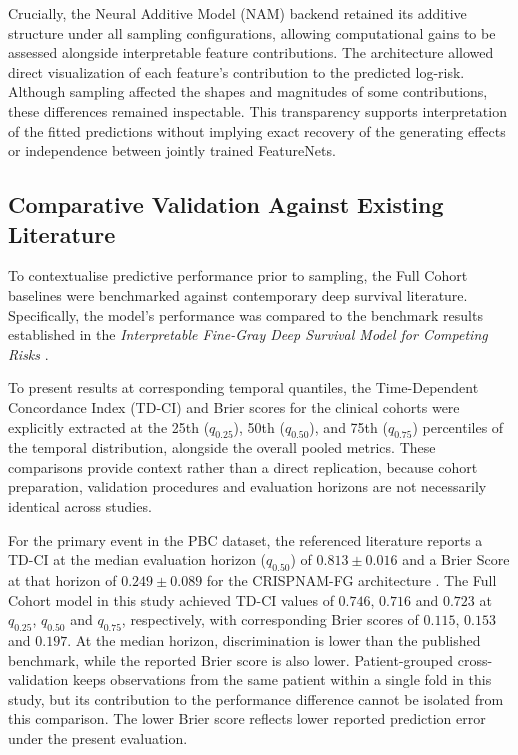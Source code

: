 \documentclass[a4paper,twoside,12pt]{report}
\begin{document}
Crucially, the Neural Additive Model (NAM) backend retained its additive structure under all sampling configurations, allowing computational gains to be assessed alongside interpretable feature contributions. The architecture allowed direct visualization of each feature's contribution to the predicted log-risk. Although sampling affected the shapes and magnitudes of some contributions, these differences remained inspectable. This transparency supports interpretation of the fitted predictions without implying exact recovery of the generating effects or independence between jointly trained FeatureNets.

\subsection{Comparative Validation Against Existing Literature}

To contextualise predictive performance prior to sampling, the Full Cohort baselines were benchmarked against contemporary deep survival literature. Specifically, the model's performance was compared to the benchmark results established in the \textit{Interpretable Fine-Gray Deep Survival Model for Competing Risks} \citep{InterpretableFineGray2025}.

To present results at corresponding temporal quantiles, the Time-Dependent Concordance Index (TD-CI) and Brier scores for the clinical cohorts were explicitly extracted at the 25th ($q_{0.25}$), 50th ($q_{0.50}$), and 75th ($q_{0.75}$) percentiles of the temporal distribution, alongside the overall pooled metrics. These comparisons provide context rather than a direct replication, because cohort preparation, validation procedures and evaluation horizons are not necessarily identical across studies.

For the primary event in the PBC dataset, the referenced literature reports a TD-CI at the median evaluation horizon ($q_{0.50}$) of $0.813 \pm 0.016$ and a Brier Score at that horizon of $0.249 \pm 0.089$ for the CRISPNAM-FG architecture \citep{InterpretableFineGray2025}. The Full Cohort model in this study achieved TD-CI values of $0.746$, $0.716$ and $0.723$ at $q_{0.25}$, $q_{0.50}$ and $q_{0.75}$, respectively, with corresponding Brier scores of $0.115$, $0.153$ and $0.197$. At the median horizon, discrimination is lower than the published benchmark, while the reported Brier score is also lower. Patient-grouped cross-validation keeps observations from the same patient within a single fold in this study, but its contribution to the performance difference cannot be isolated from this comparison. The lower Brier score reflects lower reported prediction error under the present evaluation.
\end{document}
